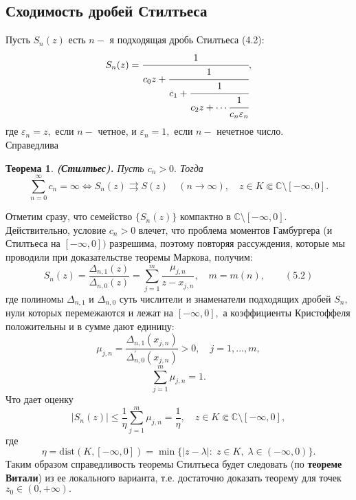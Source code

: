 \documentclass[12 pt, a4 paper]{article}
\theoremstyle{plain}   \newtheorem{Pro}{Задача}
\newtheorem{The}{Теорема}
\begin{document}
\subsection{Сходимость дробей Стилтьеса}
Пусть
$ S_n (z) $
есть
$ n- $
я подходящая дробь Стилтьеса (4.2):
\begin{equation*}
  S_n (z) =
    \cfrac{1}{c_0 z+
	  \cfrac{1}{c_1 +
	    \cfrac{1}{c_2 z + \dotsb
		  \cfrac{1}{c_n \varepsilon _n
  }}}},
\end{equation*}
где
$ \varepsilon _n =z, $
если
$ n - $
четное, и
$ \varepsilon _n =1, $
если
$ n - $
нечетное число.\\
Справедлива
\begin{The}
{\bfseries (Стилтьес).}
Пусть
$ c_n >0 . $
Тогда
\begin{equation*}
  \sum _{n=0}^{\infty} c_n = \infty \Longleftrightarrow
    S_n (z) \rightrightarrows S(z) \quad ( n \rightarrow \infty ) ,
	 \quad z \in K \Subset \mathbb{C}
	 \setminus [-\infty , 0].
\end{equation*}
\end{The}
Отметим сразу, что семейство
$ \{ S_n (z) \} $
компактно в
$ \mathbb{C} \setminus [-\infty , 0]. $
Действительно, условие
$ c_n >0 $
влечет, что проблема моментов Гамбургера
(и Стилтьеса на
$ [-\infty , 0] ) $
разрешима, поэтому повторяя рассуждения,
которые мы проводили при доказательстве теоремы
Маркова, получим:
\begin{equation*}
  S_n (z)=
    \frac{\Delta _{n,1}(z)}{\Delta _{n,0}(z)}=
	  \sum _{j=1}^m
	    \frac{\mu _{j,n}}{z-x_{j,n}},
		  \quad m=m(n), \qquad (5.2)
\end{equation*}
где полиномы
$ \Delta _{n,1} $
и
$ \Delta _{n,0} $
суть числители и знаменатели подходящих дробей
$ S_n , $
нули которых перемежаются и лежат на
$ [-\infty , 0] , $
а коэффициенты Кристоффеля положительны и в сумме дают единицу:
$$
  \mu _{j,n}=\frac{\Delta _{n,1}(x_{j,n})}
    {\Delta _{n,0}^{\prime}(x_{j,n})}>0 ,
	  \quad j=1,...,m,
$$
$$
  \sum _{j=1}^m \mu _{j,n}=1.
$$
Что дает оценку
$$
  |S_n (z)| \leqslant \frac{1}{\eta}
    \sum _{j=1}^m \mu _{j,n} =
	  \frac{1}{\eta}, \quad
	    z \in K \Subset \mathbb{C} \setminus [-\infty , 0],
$$
где
$$
  \eta =\mathrm{dist}(K,[-\infty , 0])=
    \min \{ |z-\lambda |: \; z \in K, \;
	  \lambda \in (-\infty , 0) \} .
$$
Таким образом справедливость теоремы Стилтьеса
будет следовать (по
{\bfseries теореме Витали})
из ее локального варианта, т.е. достаточно доказать
теорему для точек
$ z_0 \in (0,+\infty ) . $
\end{document}
